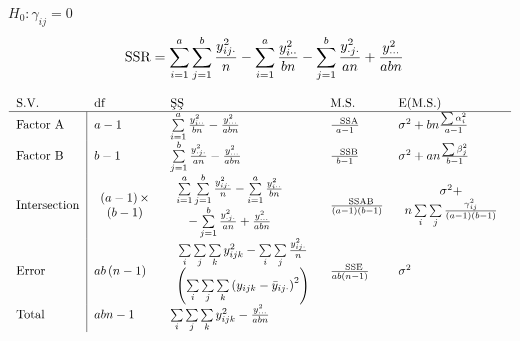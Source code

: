 \documentclass{article}
\begin{document}
$H_{0}:\gamma _{ij}=0$%
\begin{equation*}
\text{SSR}=\sum\limits_{i=1}^{a}\sum\limits_{j=1}^{b}\frac{y_{ij\cdot }^{2}}{%
n}-\sum\limits_{i=1}^{a}\frac{y_{i\cdot \cdot }^{2}}{bn}-\sum%
\limits_{j=1}^{b}\frac{y_{\cdot j\cdot }^{2}}{an}+\frac{y_{\cdot \cdot \cdot
}^{2}}{abn}
\end{equation*}

\bigskip

\begin{equation*}
\begin{tabular}{lllll}
S.V. & df & \c{S}\c{S} & M.S. & E(M.S.) \\ \hline
Factor A & \multicolumn{1}{|l}{$a-1$} & $\sum\limits_{i=1}^{a}\frac{%
y_{i\cdot \cdot }^{2}}{bn}-\frac{y_{\cdot \cdot \cdot }^{2}}{abn}$ & $\frac{%
\text{SSA}}{a-1}$ & $\sigma ^{2}+bn\frac{\sum \alpha _{i}^{2}}{a-1}$ \\ 
Factor B & \multicolumn{1}{|l}{$b-1$} & $\sum\limits_{j=1}^{b}\frac{y_{\cdot
j\cdot }^{2}}{an}-\frac{y_{\cdot \cdot \cdot }^{2}}{abn}$ & $\frac{\text{SSB}%
}{b-1}$ & $\sigma ^{2}+an\frac{\sum \beta _{j}^{2}}{b-1}$ \\ 
Intersection & \multicolumn{1}{|l}{$%
\begin{array}{c}
\left( a-1\right) \times \\ 
\left( b-1\right)%
\end{array}%
$} & $%
\begin{array}{c}
\sum\limits_{i=1}^{a}\sum\limits_{j=1}^{b}\frac{y_{ij\cdot }^{2}}{n}%
-\sum\limits_{i=1}^{a}\frac{y_{i\cdot \cdot }^{2}}{bn} \\ 
-\sum\limits_{j=1}^{b}\frac{y_{\cdot j\cdot }^{2}}{an}+\frac{y_{\cdot \cdot
\cdot }^{2}}{abn}%
\end{array}%
$ & $\frac{\text{SSAB}}{\left( a-1\right) \left( b-1\right) }$ & $%
\begin{array}{c}
\sigma ^{2}+ \\ 
n\sum\limits_{i}\sum\limits_{j}\frac{\gamma _{ij}^{2}}{\left( a-1\right)
\left( b-1\right) }%
\end{array}%
$ \\ 
Error & \multicolumn{1}{|l}{$ab\left( n-1\right) $} & $%
\begin{array}{c}
\sum\limits_{i}\sum\limits_{j}\sum\limits_{k}y_{ijk}^{2}-\sum\limits_{i}\sum%
\limits_{j}\frac{y_{ij\cdot }^{2}}{n} \\ 
\left( \sum\limits_{i}\sum\limits_{j}\sum\limits_{k}\left( y_{ijk}-\bar{y}%
_{ij\cdot }\right) ^{2}\right)%
\end{array}%
$ & $\frac{\text{SSE}}{ab\left( n-1\right) }$ & $\sigma ^{2}$ \\ 
Total & \multicolumn{1}{|l}{$abn-1$} & $\sum\limits_{i}\sum\limits_{j}\sum%
\limits_{k}y_{ijk}^{2}-\frac{y_{\cdot \cdot \cdot }^{2}}{abn}$ &  & 
\end{tabular}%
\end{equation*}
\end{document}
